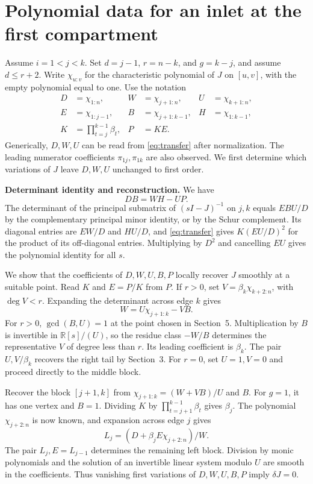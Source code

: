 \documentclass[11pt,a4paper]{article}
\newcommand{\sect}[1]{\section{#1}}
\begin{document}
\sect{Polynomial data for an inlet at the first compartment}
Assume \(i=1<j<k\). Set \(d=j-1\), \(r=n-k\), and \(g=k-j\), and assume \(d\le r+2\). Write \(\chi_{u:v}\) for the characteristic polynomial of \(J\) on \([u,v]\), with the empty polynomial equal to one. Use the notation
\[
 \begin{aligned}
 D&=\chi_{1:n},& W&=\chi_{j+1:n},& U&=\chi_{k+1:n},\\
 E&=\chi_{1:j-1},& B&=\chi_{j+1:k-1},& H&=\chi_{1:k-1},\\
 K&=\prod_{t=j}^{k-1}\beta_t,& P&=K E .
 \end{aligned}
\]
Generically, \(D,W,U\) can be read from \eqref{eq:transfer} after normalization. The leading numerator coefficients \(\pi_{1j},\pi_{1k}\) are also observed. We first determine which variations of \(J\) leave \(D,W,U\) unchanged to first order.

\noindent\textbf{Determinant identity and reconstruction.} We have
\begin{equation}
                     D B=W H-U P . \label{eq:condensation}
\end{equation}
The determinant of the principal submatrix of \((sI-J)^{-1}\) on \(j,k\) equals \(EBU/D\) by the complementary principal minor identity, or by the Schur complement. Its diagonal entries are \(EW/D\) and \(HU/D\), and \eqref{eq:transfer} gives \(K(EU/D)^2\) for the product of its off-diagonal entries. Multiplying by \(D^2\) and cancelling \(EU\) gives the polynomial identity for all \(s\).

We show that the coefficients of \(D,W,U,B,P\) locally recover \(J\) smoothly at a suitable point. Read \(K\) and \(E=P/K\) from \(P\). If \(r>0\), set \(V=\beta_k\chi_{k+2:n}\), with \(\deg V<r\). Expanding the determinant across edge \(k\) gives
\[
              W=U\chi_{j+1:k}-V B .
\]
For \(r>0\), \(\gcd(B,U)=1\) at the point chosen in Section~5. Multiplication by \(B\) is invertible in \(\mathbb R[s]/(U)\), so the residue class \(-W/B\) determines the representative \(V\) of degree less than \(r\). Its leading coefficient is \(\beta_k\). The pair \(U,V/\beta_k\) recovers the right tail by Section~3. For \(r=0\), set \(U=1,V=0\) and proceed directly to the middle block.

Recover the block \([j+1,k]\) from \(\chi_{j+1:k}=(W+VB)/U\) and \(B\). For \(g=1\), it has one vertex and \(B=1\). Dividing \(K\) by \(\prod_{t=j+1}^{k-1}\beta_t\) gives \(\beta_j\). The polynomial \(\chi_{j+2:n}\) is now known, and expansion across edge \(j\) gives
\[
            L_j=(D+\beta_j E\chi_{j+2:n})/W .
\]
The pair \(L_j,E=L_{j-1}\) determines the remaining left block. Division by monic polynomials and the solution of an invertible linear system modulo \(U\) are smooth in the coefficients. Thus vanishing first variations of \(D,W,U,B,P\) imply \(\delta J=0\).
\end{document}
